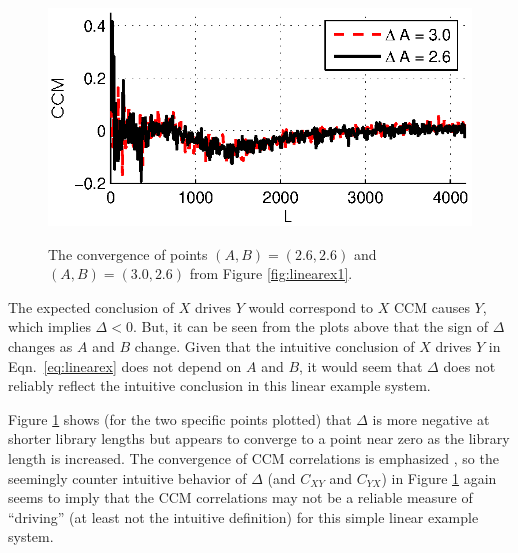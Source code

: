 \documentclass[a4paper,11pt,twocolumn]{article}
\begin{document}
\begin{center}
\begin{figure}[ht]
\includegraphics[scale=0.9]{LinearExChangeL.eps} \\
\caption{The convergence of points $(A,B) = (2.6,2.6)$ and $(A,B)=(3.0,2.6)$ from Figure \ref{fig:linearex1}.}
\label{fig:linearex1a}
\end{figure}
\end{center}
The expected conclusion of $X$ drives $Y$ would correspond to  $X$ CCM causes $Y$, which implies $\Delta<0$.  But, it can be seen from the plots above that the sign of $\Delta$ changes as $A$ and $B$ change.  Given that the intuitive conclusion of $X$ drives $Y$ in Eqn.\ \ref{eq:linearex} does not depend on $A$ and $B$, it would seem that $\Delta$ does not reliably reflect the intuitive conclusion in this linear example system.  

Figure \ref{fig:linearex1a} shows (for the two specific points plotted) that $\Delta$ is more negative at shorter library lengths but appears to converge to a point near zero as the library length is increased.  The convergence of CCM correlations is emphasized \cite{Sugihara2012}, so the seemingly counter intuitive behavior of $\Delta$ (and $C_{XY}$ and $C_{YX}$) in Figure \ref{fig:linearex1a} again seems to imply that the CCM correlations may not be a reliable measure of ``driving'' (at least not the intuitive definition) for this simple linear example system.
\end{document}
